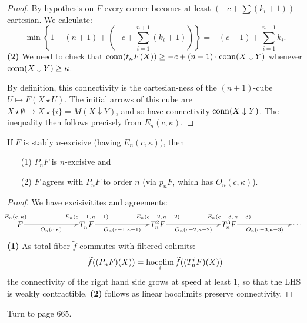\documentclass[11pt]{article}
\begin{document}
\begin{Calculus II}
\begin{proof}
By hypothesis on $F$ every corner becomes at least $(-c+\sum(k_i+1))$-cartesian. We calculate: 
\[\min\left\{1-(n+1)+\left(-c+\sum_{i=1}^{n+1} (k_i+1)\right)\right\} =-(c-1)+\sum_{i=1}^{n+1} k_i.\]
\textbf{(2)} We need to check that $\operatorname{conn}(t_nF(X))\geq-c+(n+1)\cdot\operatorname{conn}(X\downarrow Y)$ whenever $\operatorname{conn}(X\downarrow Y)\geq\kappa$.

By definition, this connectivity is the cartesian-ness of the $(n+1)$-cube $U\mapsto F(X\star U)$. The initial arrows of this cube are $X\star\emptyset\to X\star\{i\}=M(X\downarrow Y)$, and so have connectivity $\operatorname{conn}(X\downarrow Y)$. The inequality then follows precisely from $E_n(c,\kappa)$.
\end{proof}
\begin{prop*}[1.5]
If $F$ is stably
$n$-excisive (having $E_n(c,\kappa)$), then
\begin{enumerate}\squishlist
\setlength{\parindent}{.25in}
\item[\textup{(1)}] $P_nF$ is $n$-excisive and
\item[\textup{(2)}] $F$ agrees with
  $P_nF$ to order $n$ (via $p_nF$, which has $O_n(c,\kappa)$).
\end{enumerate}
\end{prop*}
\begin{proof}
We have excisivitites and agreements:
\[
\vcenter{\xymatrix@1@C=2.5cm{
\overset{\makebox[0cm][c]{\scriptsize$E_n(c,\kappa)$}}{\phantom{T_n^2}F}
\ar[r]_-{O_n(c,\kappa)}
&%
\overset{\makebox[0cm][c]{\scriptsize$E_n(c-1,\kappa-1)$}}{T_n^{\phantom{1}}F}
\ar[r]_-{O_n(c-1,\kappa-1)}
&%
\overset{\makebox[0cm][c]{\scriptsize$E_n(c-2,\kappa-2)$}}{T_n^2F}
\ar[r]_-{O_n(c-2,\kappa-2)}
&%
\overset{\makebox[0cm][c]{\scriptsize$E_n(c-3,\kappa-3)$}}{T_n^3F}
\ar[r]_-{O_n(c-3,\kappa-3)}
&%
\cdots
}}\]
\textbf{(1)} As total fiber $\widetilde{f}$ commutes with filtered colimits:
\[\widetilde{f}((P_nF)(X))=\operatorname*{hocolim}_i\widetilde{f}((T_n^iF)(X))\]
the connectivity of the right hand side grows at speed at least $1$, so that the LHS is weakly contractible.
\textbf{(2)} follows as linear hocolimits preserve connectivity. 
\end{proof}
Turn to page 665.
\end{Calculus II}
\end{document}
